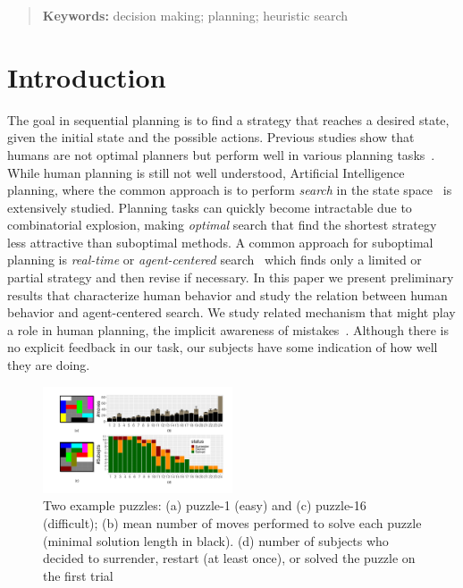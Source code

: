 \documentclass[10pt,letterpaper]{article}
\begin{document}
\vspace{-0.23cm}
\begin{quote}
\small
\textbf{Keywords:} 
decision making; planning; heuristic search
\end{quote}


\vspace{-0.5cm}
\section{Introduction}

The goal in sequential planning is to find a strategy that reaches a desired state, given the initial state and the possible actions.
Previous studies show that humans are not optimal planners but perform well in various planning tasks~\cite{acuna2008bayesian,pizlo2005solving,macgregor1996human,van2016people}. While human planning is still not well understood, Artificial Intelligence planning, where the common approach is to perform \emph{search} in the state space~\cite{russell1995modern} is extensively studied. Planning tasks can quickly become intractable due to combinatorial explosion, making \emph{optimal} search that find the shortest strategy ~\cite{korf1985depth,hart1968formal} less attractive than suboptimal methods. A common approach for suboptimal planning is \emph{real-time} or \emph{agent-centered} search~\cite{korf1990real,koenig2001agent} which finds only a limited or partial strategy and then revise if necessary. In this paper we present preliminary results that characterize human behavior and study the relation between human behavior and agent-centered search. We study related mechanism that might play a role in human planning, the implicit awareness of mistakes~\cite{yeung2012metacognition}. Although there is no explicit feedback in our task, our subjects have some indication of how well they are doing.

\begin{figure}[ht]
	\includegraphics[width=0.5\textwidth]{puzzle_j}
\vspace{-0.5cm}
\caption{ Two example puzzles: (a) puzzle-1 (easy) and (c) puzzle-16 (difficult); (b) mean number of moves performed to solve each puzzle (minimal solution length in black). (d) number of subjects who decided to surrender, restart (at least once), or solved the puzzle on the first trial}
	\label{fig:puzzle}
\vspace{-1.0cm}
\end{figure}
\end{document}
